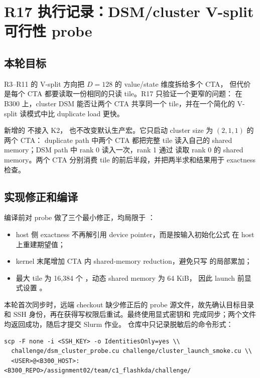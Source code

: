 \section{R17 执行记录：DSM/cluster V-split 可行性 probe}

\subsection{本轮目标}

R3--R11 的 V-split 方向把 \(D=128\) 的 value/state 维度拆给多个 CTA，
但代价是每个 CTA 都要读取一份相同的只读 tile。R17 只验证一个更窄的问题：
在 B300 上，cluster DSM 能否让两个 CTA 共享同一个 tile，并在一个简化的
V-split 读模式中比 duplicate load 更快。

新增的  不接入 \FlashKDA{} K2，
也不改变默认生产宏。它只启动 cluster size 为 \((2,1,1)\) 的两个 CTA：
duplicate path 中两个 CTA 都把完整 tile 读入自己的 shared memory；DSM
path 中 rank 0 读入一次，rank 1 通过
 读取 rank 0 的 shared memory。两个 CTA
分别消费 tile 的前后半段，并把两半求和结果用于 exactness 检查。

\subsection{实现修正和编译}

编译前对 probe 做了三个最小修正，均局限于
：

\begin{itemize}
  \item host 侧 exactness 不再解引用 device pointer，而是按输入初始化公式
        在 host 上重建期望值；
  \item kernel 末尾增加 CTA 内 shared-memory reduction，避免只写
         的局部累加；
  \item 最大 tile 为 16,384 个 ，动态 shared memory 为 64 KiB，
        因此 launch 前显式设置
        。
\end{itemize}

本轮首次同步时，远端 checkout 缺少修正后的 probe 源文件，故先确认目标目录
和 SSH 身份，再在获得写权限后重试。最终使用显式密钥和
 完成同步；两个文件均返回成功，随后才提交 Slurm 作业。
仓库中只记录脱敏后的命令形式：

\begin{lstlisting}
scp -F none -i <SSH_KEY> -o IdentitiesOnly=yes \\
  challenge/dsm_cluster_probe.cu challenge/cluster_launch_smoke.cu \\
  <USER>@<B300_HOST>:<B300_REPO>/assignment02/team/c1_flashkda/challenge/
\end{lstlisting}

